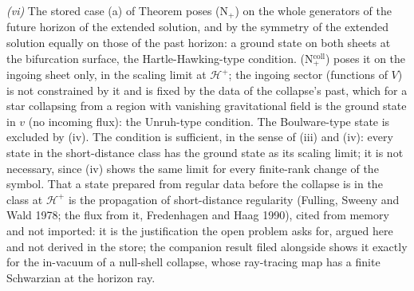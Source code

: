 \emph{(vi)} The stored case (a) of Theorem  poses (N$_{+}$) on the whole generators of the future horizon of the extended solution, and by the symmetry of the extended solution equally on those of the past horizon: a ground state on both sheets at the bifurcation surface, the Hartle-Hawking-type condition. (N$_{+}^{\mathrm{coll}}$) poses it on the ingoing sheet only, in the scaling limit at $\mathcal{H}^{+}$; the ingoing sector (functions of $V$) is not constrained by it and is fixed by the data of the collapse's past, which for a star collapsing from a region with vanishing gravitational field is the ground state in $v$ (no incoming flux): the Unruh-type condition. The Boulware-type state is excluded by (iv). The condition is sufficient, in the sense of (iii) and (iv): every state in the short-distance class has the ground state as its scaling limit; it is not necessary, since (iv) shows the same limit for every finite-rank change of the symbol. That a state prepared from regular data before the collapse is in the class at $\mathcal{H}^{+}$ is the propagation of short-distance regularity (Fulling, Sweeny and Wald 1978; the flux from it, Fredenhagen and Haag 1990), cited from memory and not imported: it is the justification the open problem asks for, argued here and not derived in the store; the companion result filed alongside shows it exactly for the in-vacuum of a null-shell collapse, whose ray-tracing map has a finite Schwarzian at the horizon ray.

